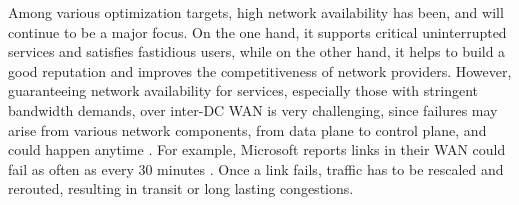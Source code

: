 \documentclass[sigconf]{acmart}
\begin{document}
Among various optimization targets, high network availability has been, and will continue to be a major focus. On the one hand, it supports critical uninterrupted services and satisfies fastidious users, while on the other hand, it helps to build a good reputation and improves the competitiveness of network providers. However, guaranteeing network availability for services, especially those with stringent bandwidth demands, over inter-DC WAN is very challenging, 
since failures may arise from various network components, from data plane to control plane, and could happen anytime \cite{evole,california,understanding}.
For example, Microsoft reports links in their WAN could fail as often as every 30 minutes \cite{FFC}.
Once a link fails, traffic has to be rescaled and rerouted, resulting in transit or long lasting congestions. 
\end{document}
